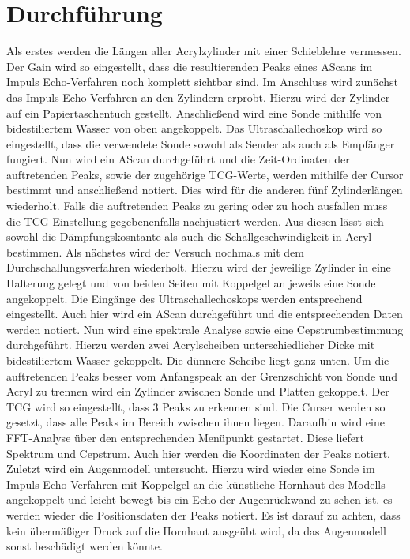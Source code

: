 
\section{Durchführung}
\label{sec:Durchführung}
Als erstes werden die Längen aller Acrylzylinder mit einer Schieblehre vermessen.
Der Gain wird so eingestellt, dass die resultierenden Peaks eines AScans im Impuls Echo-Verfahren
noch komplett sichtbar sind.
Im Anschluss wird zunächst das Impuls-Echo-Verfahren an den Zylindern erprobt.
Hierzu wird der Zylinder auf ein Papiertaschentuch gestellt. Anschließend wird eine Sonde
 mithilfe von bidestiliertem Wasser von oben angekoppelt. Das Ultraschallechoskop
 wird so eingestellt, dass die verwendete Sonde sowohl als Sender als auch als Empfänger fungiert.
 Nun wird ein AScan durchgeführt und die Zeit-Ordinaten der auftretenden Peaks, sowie der zugehörige TCG-Werte, werden mithilfe der Cursor bestimmt und anschließend notiert.
 Dies wird für die anderen fünf Zylinderlängen wiederholt. Falls die auftretenden
 Peaks zu gering oder zu hoch ausfallen muss die TCG-Einstellung gegebenenfalls nachjustiert werden.
 Aus diesen lässt sich sowohl die Dämpfungskosntante als auch die
 Schallgeschwindigkeit in Acryl bestimmen.
 Als nächstes wird der Versuch nochmals mit dem Durchschallungsverfahren wiederholt.
 Hierzu wird der jeweilige Zylinder in eine Halterung gelegt und von beiden
 Seiten mit Koppelgel an jeweils eine Sonde angekoppelt. Die Eingänge des Ultraschallechoskops
 werden entsprechend eingestellt. Auch hier wird ein AScan durchgeführt und die
 entsprechenden Daten werden notiert.
 Nun wird eine spektrale Analyse sowie eine Cepstrumbestimmung durchgeführt. Hierzu
 werden zwei Acrylscheiben unterschiedlicher Dicke mit bidestiliertem Wasser gekoppelt.
 Die dünnere Scheibe liegt ganz unten. Um die auftretenden Peaks besser vom
 Anfangspeak an der Grenzschicht von Sonde und Acryl zu trennen wird ein Zylinder
 zwischen Sonde und Platten gekoppelt. Der TCG wird so eingestellt, dass 3 Peaks zu erkennen sind.
 Die Curser werden so gesetzt, dass alle Peaks im Bereich zwischen ihnen liegen. Daraufhin wird eine
 FFT-Analyse über den entsprechenden Menüpunkt gestartet. Diese liefert Spektrum und Cepstrum.
 Auch hier werden die Koordinaten der Peaks notiert.
 Zuletzt wird ein Augenmodell untersucht. Hierzu wird wieder eine
 Sonde im Impuls-Echo-Verfahren mit Koppelgel an die künstliche Hornhaut des Modells angekoppelt
 und leicht bewegt bis ein Echo der Augenrückwand zu sehen ist. es werden wieder
 die Positionsdaten der Peaks notiert. Es ist darauf zu achten, dass kein übermäßiger
 Druck auf die Hornhaut ausgeübt wird, da das Augenmodell sonst beschädigt werden könnte.

